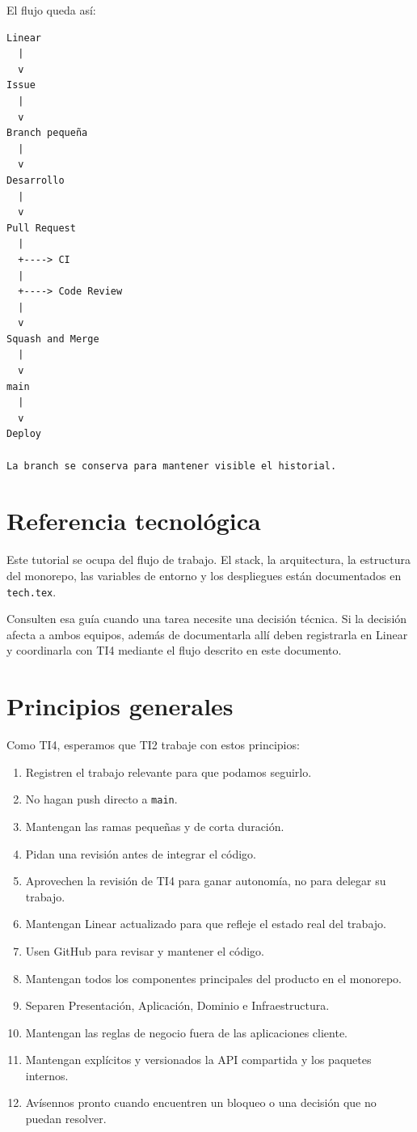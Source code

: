 \documentclass[11pt,a4paper]{article}
\begin{document}
El flujo queda así:

\begin{lstlisting}
Linear
  |
  v
Issue
  |
  v
Branch pequeña
  |
  v
Desarrollo
  |
  v
Pull Request
  |
  +----> CI
  |
  +----> Code Review
  |
  v
Squash and Merge
  |
  v
main
  |
  v
Deploy

La branch se conserva para mantener visible el historial.
\end{lstlisting}


\section{Referencia tecnológica}

Este tutorial se ocupa del flujo de trabajo. El stack, la arquitectura, la
estructura del monorepo, las variables de entorno y los despliegues están
documentados en \texttt{tech.tex}.

Consulten esa guía cuando una tarea necesite una decisión técnica. Si la
decisión afecta a ambos equipos, además de documentarla allí deben registrarla
en Linear y coordinarla con TI4 mediante el flujo descrito en este documento.


\section{Principios generales}

Como TI4, esperamos que TI2 trabaje con estos principios:

\begin{enumerate}
  \item Registren el trabajo relevante para que podamos seguirlo.
  \item No hagan push directo a \texttt{main}.
  \item Mantengan las ramas pequeñas y de corta duración.
  \item Pidan una revisión antes de integrar el código.
  \item Aprovechen la revisión de TI4 para ganar autonomía, no para delegar su
    trabajo.
  \item Mantengan Linear actualizado para que refleje el estado real del
    trabajo.
  \item Usen GitHub para revisar y mantener el código.
  \item Mantengan todos los componentes principales del producto en el
    monorepo.
  \item Separen Presentación, Aplicación, Dominio e Infraestructura.
  \item Mantengan las reglas de negocio fuera de las aplicaciones cliente.
  \item Mantengan explícitos y versionados la API compartida y los paquetes
    internos.
  \item Avísennos pronto cuando encuentren un bloqueo o una decisión que no
    puedan resolver.
\end{enumerate}
\end{document}
